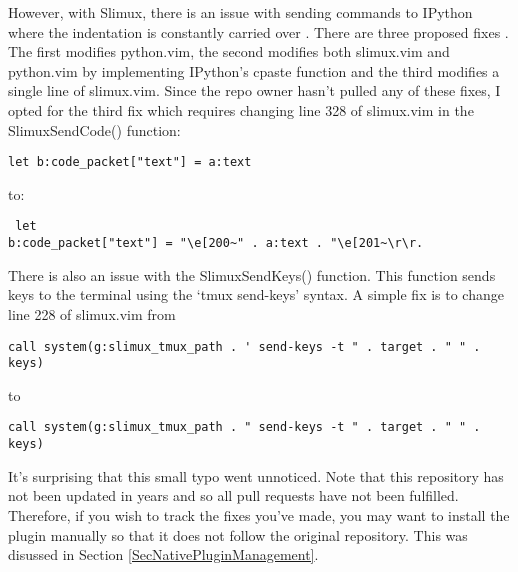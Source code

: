 \documentclass[10pt]{article}
\begin{document}
However, with Slimux, there is an issue with sending commands to IPython where the
indentation is constantly carried over \cite{kmARC2015indentationerror}. There
are three proposed fixes
\cite{lotabout2017remove,karadaharu2016add,zcesur2018fix}. The first modifies
python.vim, the second modifies both slimux.vim and python.vim by implementing
IPython's cpaste function and the third modifies a single line of slimux.vim.
Since the repo owner hasn't pulled any of these fixes, I opted for the third fix
which requires changing line 328 of slimux.vim in the SlimuxSendCode() function:
\begin{lstlisting}
let b:code_packet["text"] = a:text
\end{lstlisting}
to:
\begin{lstlisting} let
b:code_packet["text"] = "\e[200~" . a:text . "\e[201~\r\r.
\end{lstlisting}
There is also an issue with the SlimuxSendKeys() function. This function sends
keys to the terminal using the `tmux send-keys' syntax. A simple fix is to
change line 228 of slimux.vim from
\begin{lstlisting}
call system(g:slimux_tmux_path . ' send-keys -t " . target . " " . keys)
\end{lstlisting}
to
\begin{lstlisting}
call system(g:slimux_tmux_path . " send-keys -t " . target . " " . keys)
\end{lstlisting}
It's surprising that this small typo went unnoticed. Note that this repository has not
been updated in years and so all pull requests have not been fulfilled.
Therefore, if you wish to track the fixes you've made, you may want to install
the plugin manually so that it does not follow the original repository. This was
disussed in Section \ref{SecNativePluginManagement}.\\
\end{document}

